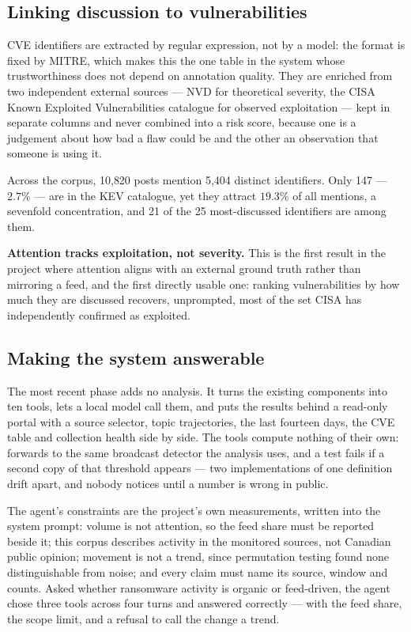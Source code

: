 \documentclass[11pt]{article}
\begin{document}
\subsection*{Linking discussion to vulnerabilities}

CVE identifiers are extracted by regular expression, not by a model: the format
is fixed by MITRE, which makes this the one table in the system whose
trustworthiness does not depend on annotation quality. They are enriched from
two independent external sources --- NVD for theoretical severity, the CISA
Known Exploited Vulnerabilities catalogue for observed exploitation --- kept in
separate columns and never combined into a risk score, because one is a
judgement about how bad a flaw could be and the other an observation that
someone is using it.

Across the corpus, 10{,}820 posts mention 5{,}404 distinct identifiers. Only
147 --- $2.7\%$ --- are in the KEV catalogue, yet they attract $19.3\%$ of all
mentions, a sevenfold concentration, and 21 of the 25 most-discussed
identifiers are among them.

\begin{keybox}
\textbf{Attention tracks exploitation, not severity.} This is the first result
in the project where attention aligns with an external ground truth rather than
mirroring a feed, and the first directly usable one: ranking vulnerabilities by
how much they are discussed recovers, unprompted, most of the set CISA has
independently confirmed as exploited.
\end{keybox}

\subsection*{Making the system answerable}

The most recent phase adds no analysis. It turns the existing components into
ten tools, lets a local model call them, and puts the results behind a
read-only portal with a source selector, topic trajectories, the last fourteen
days, the CVE table and collection health side by side. The tools compute
nothing of their own:  forwards to the same
broadcast detector the analysis uses, and a test fails if a second copy of that
threshold appears --- two implementations of one definition drift apart, and
nobody notices until a number is wrong in public.



The agent's constraints are the project's own measurements, written into the
system prompt: volume is not attention, so the feed share must be reported
beside it; this corpus describes activity in the monitored sources, not
Canadian public opinion; movement is not a trend, since permutation testing
found none distinguishable from noise; and every claim must name its source,
window and counts. Asked whether ransomware activity is organic or feed-driven,
the agent chose three tools across four turns and answered correctly --- with
the feed share, the scope limit, and a refusal to call the change a trend.
\end{document}
